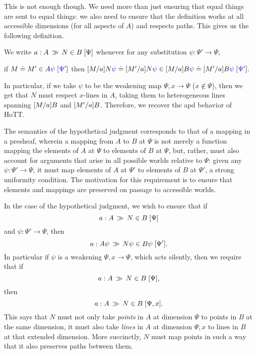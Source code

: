 \documentclass{article}
\begin{document}
This is not enough though. We need more than just ensuring that equal things
are sent to equal things: we also need to ensure that the definition works at all
accessible dimensions (for all aspects of $A$) and respects paths. This gives
us the following definition.

\begin{definition*} We write $a : A \, \gg \, N \in B \; [\Psi]$ whenever
  for any substitution $\psi : \Psi' \to \Psi$, 
  \begin{center}
  if 
  $M \doteq M' \in A{\color{blue} \psi} \; [{\color{blue} \Psi'}]$ then
  $[M/a]N{\color{blue} \psi} \doteq [M'/a]N{\color{blue} \psi} \in [M/a]B{\color{blue} \psi} \doteq [M'/a]B{\color{blue} \psi} \; [{\color{blue} \Psi'}].$
  \end{center} 
\end{definition*}
In particular, if we take $\psi$ to be the weakening map $\Psi, x \to \Psi$
($x \notin \Psi$), then we get that $N$ must respect $x$-lines in $A$, taking
them to heterogeneous lines spanning $[M/a]B$ and $[M'/a]B$.
Therefore, we recover the \textsf{apd} behavior of HoTT.

\bigskip

The semantics of the hypothetical judgment corresponds to that of a mapping in a presheaf, wherein a mapping
from $A$ to $B$ at $\Psi$ is not merely a function mapping the elements of $A$ at $\Psi$ to elements of $B$ at
$\Psi$, but, rather, must also account for arguments that arise in all possible worlds relative to $\Psi$:
given any $\psi:\Psi'\to\Psi$, it must map elements of $A$ at $\Psi'$ to elements of $B$ at $\Psi'$, a strong
uniformity condition.  The motivation for this requirement is to ensure that elements and mappings are
preserved on passage to accessible worlds.

In the case of the hypothetical judgment, we wish to ensure that if
\[ a : A \, \gg \, N \in B \; [\Psi] \]
and $\psi:\Psi'\to\Psi$, then
\[ a : A\psi \, \gg \, N\psi \in B\psi \; [\Psi'] .\]
%
In particular if $\psi$ is a weakening $\Psi,x\to\Psi$, which acts silently, then we require that if
\[ a : A \, \gg \, N \in B \; [\Psi],\]
then 
\[ a : A \, \gg \, N \in B \; [\Psi,x] .\]
%
This says that $N$ must not only take \emph{points} in $A$ at dimension $\Psi$ to points in $B$ at the same
dimension, it must also take \emph{lines} in $A$ at dimension $\Psi,x$ to lines in $B$ at that extended
dimension.  More succinctly, $N$ must map points in such a way that it also preserves paths between them.


\nocite{HoTTBook:13}
\nocite{Angiuli:chtt3:17}
\nocite{Angiuli:chtt:17}



\end{document}
